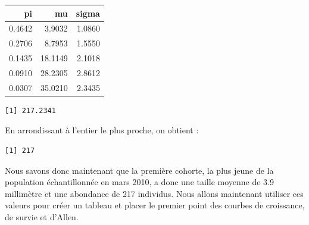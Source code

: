 \documentclass[
  a4paper,
  DIV=11,
  numbers=noendperiod,
  oneside]{scrreprt}
\newenvironment{Shaded}{}{}
\newcommand{\DecValTok}[1]{\textcolor[rgb]{0.00,0.36,0.77}{#1}}
\newcommand{\FunctionTok}[1]{\textcolor[rgb]{0.44,0.26,0.76}{#1}}
\newcommand{\NormalTok}[1]{\textcolor[rgb]{0.14,0.16,0.18}{#1}}
\newcommand{\SpecialCharTok}[1]{\textcolor[rgb]{0.00,0.36,0.77}{#1}}
\begin{document}
\begin{margintable}

\begin{longtable}[]{@{}rrr@{}}
\toprule()
pi & mu & sigma \\
\midrule()
\endhead
0.4642 & 3.9032 & 1.0860 \\
0.2706 & 8.7953 & 1.5550 \\
0.1435 & 18.1149 & 2.1018 \\
0.0910 & 28.2305 & 2.8612 \\
0.0307 & 35.0210 & 2.3435 \\
\bottomrule()
\end{longtable}

\end{margintable}

\begin{Shaded}
\end{Shaded}

\begin{verbatim}
[1] 217.2341
\end{verbatim}

En arrondissant à l'entier le plus proche, on obtient :

\begin{Shaded}
\end{Shaded}

\begin{verbatim}
[1] 217
\end{verbatim}


Nous savons donc maintenant que la première cohorte, la plus jeune de la
population échantillonnée en mars 2010, a donc une taille moyenne de 3.9
millimètre et une abondance de 217 individus. Nous allons maintenant
utiliser ces valeurs pour créer un tableau et placer le premier point
des courbes de croissance, de survie et d'Allen.
\end{document}
